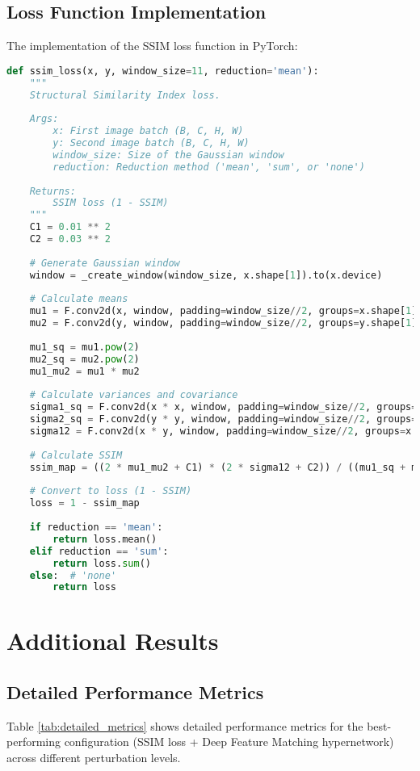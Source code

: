 \subsection{Loss Function Implementation}
The implementation of the SSIM loss function in PyTorch:

\begin{lstlisting}[language=Python]
def ssim_loss(x, y, window_size=11, reduction='mean'):
    """
    Structural Similarity Index loss.
    
    Args:
        x: First image batch (B, C, H, W)
        y: Second image batch (B, C, H, W)
        window_size: Size of the Gaussian window
        reduction: Reduction method ('mean', 'sum', or 'none')
        
    Returns:
        SSIM loss (1 - SSIM)
    """
    C1 = 0.01 ** 2
    C2 = 0.03 ** 2
    
    # Generate Gaussian window
    window = _create_window(window_size, x.shape[1]).to(x.device)
    
    # Calculate means
    mu1 = F.conv2d(x, window, padding=window_size//2, groups=x.shape[1])
    mu2 = F.conv2d(y, window, padding=window_size//2, groups=y.shape[1])
    
    mu1_sq = mu1.pow(2)
    mu2_sq = mu2.pow(2)
    mu1_mu2 = mu1 * mu2
    
    # Calculate variances and covariance
    sigma1_sq = F.conv2d(x * x, window, padding=window_size//2, groups=x.shape[1]) - mu1_sq
    sigma2_sq = F.conv2d(y * y, window, padding=window_size//2, groups=y.shape[1]) - mu2_sq
    sigma12 = F.conv2d(x * y, window, padding=window_size//2, groups=x.shape[1]) - mu1_mu2
    
    # Calculate SSIM
    ssim_map = ((2 * mu1_mu2 + C1) * (2 * sigma12 + C2)) / ((mu1_sq + mu2_sq + C1) * (sigma1_sq + sigma2_sq + C2))
    
    # Convert to loss (1 - SSIM)
    loss = 1 - ssim_map
    
    if reduction == 'mean':
        return loss.mean()
    elif reduction == 'sum':
        return loss.sum()
    else:  # 'none'
        return loss
\end{lstlisting}

\section{Additional Results}

\subsection{Detailed Performance Metrics}
Table \ref{tab:detailed_metrics} shows detailed performance metrics for the best-performing configuration (SSIM loss + Deep Feature Matching hypernetwork) across different perturbation levels.

